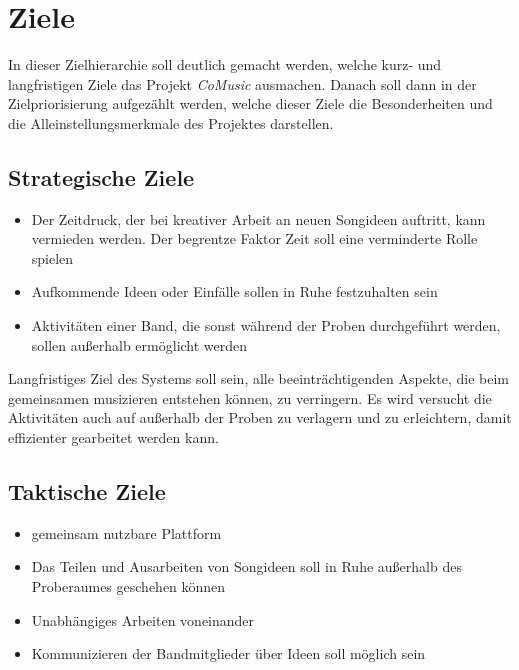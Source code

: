 \documentclass[12pt]{scrartcl}
\begin{document}

\section{Ziele}

In dieser Zielhierarchie soll deutlich gemacht werden, welche kurz- und langfristigen Ziele das Projekt \emph{CoMusic} ausmachen. Danach soll dann in der Zielpriorisierung aufgezählt werden, welche dieser Ziele die Besonderheiten und die Alleinstellungsmerkmale des Projektes darstellen.

\subsection{Strategische Ziele}

\begin{itemize}


\item Der Zeitdruck, der bei kreativer Arbeit an neuen Songideen auftritt, kann vermieden werden. Der begrentze Faktor Zeit soll eine verminderte Rolle spielen
\item Aufkommende Ideen oder Einfälle sollen in Ruhe festzuhalten sein
\item Aktivitäten einer Band, die sonst während der Proben durchgeführt werden, sollen außerhalb ermöglicht werden
\end{itemize}

Langfristiges Ziel des Systems soll sein, alle beeinträchtigenden Aspekte, die beim gemeinsamen musizieren entstehen können, zu verringern. Es wird versucht die Aktivitäten auch auf außerhalb der Proben zu verlagern und zu erleichtern, damit effizienter gearbeitet werden kann.

\subsection{Taktische Ziele}


\begin{itemize}
\item gemeinsam nutzbare Plattform
\item Das Teilen und Ausarbeiten von Songideen soll in Ruhe außerhalb des Proberaumes geschehen können
\item Unabhängiges Arbeiten voneinander
\item Kommunizieren der Bandmitglieder über Ideen soll möglich sein
\
\end{itemize}
\end{document}
